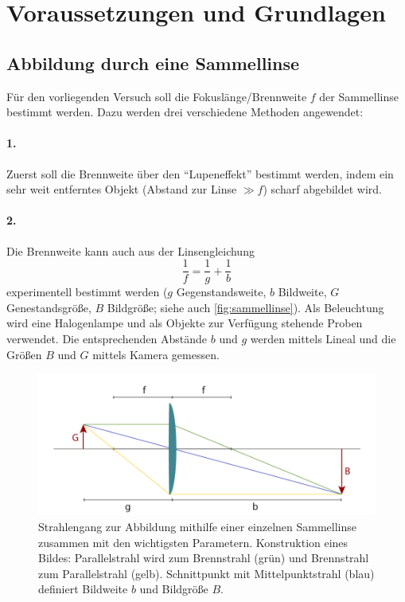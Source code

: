 \documentclass[ngerman]{scrartcl}
\begin{document}
\section[Voraussetzungen und Grundlagen]{Voraussetzungen und Grundlagen \cite{ref:angabe}}
\label{sec:voraussetzungen_grundlagen}

\subsection{Abbildung durch eine Sammellinse}
\label{subsec:abbildung_sammellinse_Grundlagen}

Für den vorliegenden Versuch soll die Fokuslänge/Brennweite $f$ der Sammellinse bestimmt werden. Dazu werden drei verschiedene Methoden angewendet:

\paragraph{1.}
Zuerst soll die Brennweite über den \enquote{Lupeneffekt} bestimmt werden, indem ein sehr weit entferntes Objekt (Abstand zur Linse $\gg f$) scharf abgebildet wird.

\paragraph{2.} Die Brennweite kann auch aus der Linsengleichung
%
\begin{equation}
    \label{eq:linsengleichung}
    \frac{1}{f} = \frac{1}{g} + \frac{1}{b}
\end{equation}
%
experimentell bestimmt werden ($g$ Gegenstandsweite, $b$ Bildweite, $G$ Genestandsgröße, $B$ Bildgröße; siehe auch \autoref{fig:sammellinse}). Als Beleuchtung wird eine Halogenlampe und als Objekte zur Verfügung
stehende Proben verwendet. Die entsprechenden Abstände $b$ und $g$ werden mittels Lineal und die Größen $B$ und $G$ mittels Kamera gemessen.
%
\begin{figure}[H]
    \centering
    \begin{samepage}
        \includegraphics[width=\linewidth]{fig/Sammellinse.png}
        \caption[Strahlengang einer Sammellinse]{Strahlengang zur Abbildung mithilfe einer einzelnen Sammellinse zusammen mit den wichtigsten Parametern. Konstruktion eines Bildes: Parallelstrahl wird zum Brennstrahl (grün) und Brennstrahl zum Parallelstrahl (gelb). Schnittpunkt mit Mittelpunktstrahl (blau) definiert Bildweite $b$ und Bildgröße $B$.}
        \label{fig:sammellinse}
    \end{samepage}
\end{figure}
\end{document}
